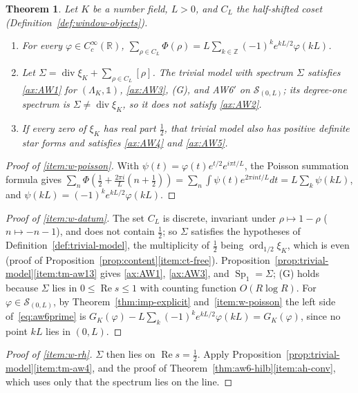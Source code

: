 \documentclass[11pt]{amsart}
\theoremstyle{plain}
\newtheorem{theorem}{Theorem}[section]
\theoremstyle{definition}
\theoremstyle{remark}
\numberwithin{equation}{section}
\newcommand{\R}{\mathbb{R}}
\newcommand{\Z}{\mathbb{Z}}
\DeclareMathOperator{\divisor}{div}
\DeclareMathOperator{\Rea}{Re}
\DeclareMathOperator{\ord}{ord}
\renewcommand{\Re}{\Rea}
\begin{document}
\begin{theorem}\label{thm:window}
Let $K$ be a number field, $L>0$, and $C_L$ the half-shifted coset
(Definition~\ref{def:window-objects}).
\begin{enumerate}[label=(\roman*)]
\item\label{item:w-poisson} For every $\varphi\in C_c^\infty(\R)$,
  $\sum_{\rho\in C_L}\Phi(\rho)=L\sum_{k\in\Z}(-1)^ke^{kL/2}\varphi(kL)$.
\item\label{item:w-datum} Let $\Sigma=\divisor\xi_K+\sum_{\rho\in
  C_L}[\rho]$. The trivial model with spectrum $\Sigma$ satisfies
  \ref{ax:AW1} for $(\Lambda_K,\mathbb 1)$, \ref{ax:AW3}, (G), and
  AW6$'$ on $\mathcal S_{(0,L)}$; its degree-one spectrum is
  $\Sigma\ne\divisor\xi_K$, so it does not satisfy \ref{ax:AW2}.
\item\label{item:w-rh} If every zero of $\xi_K$ has real part
  $\tfrac12$, that trivial model also has positive definite star forms
  and satisfies \ref{ax:AW4} and \ref{ax:AW5}.
\end{enumerate}
\end{theorem}

\begin{proof}[Proof of \ref{item:w-poisson}]
With $\psi(t)=\varphi(t)e^{t/2}e^{i\pi t/L}$, the Poisson summation
formula gives $\sum_n\Phi(\tfrac12+\tfrac{2\pi i}L(n+\tfrac12))
=\sum_n\int\psi(t)e^{2\pi int/L}dt=L\sum_k\psi(kL)$, and
$\psi(kL)=(-1)^ke^{kL/2}\varphi(kL)$.
\end{proof}

\begin{proof}[Proof of \ref{item:w-datum}]
The set $C_L$ is discrete, invariant under $\rho\mapsto1-\rho$ ($n\mapsto
-n-1$), and does not contain $\tfrac12$; so $\Sigma$ satisfies the
hypotheses of Definition~\ref{def:trivial-model}, the multiplicity of
$\tfrac12$ being $\ord_{1/2}\xi_K$, which is even (proof of
Proposition~\ref{prop:content}\ref{item:ct-free}).
Proposition~\ref{prop:trivial-model}\ref{item:tm-aw13} gives
\ref{ax:AW1}, \ref{ax:AW3}, and $\operatorname{Sp}_1=\Sigma$; (G) holds
because $\Sigma$ lies in $0\le\Re s\le1$ with counting function
$O(R\log R)$. For $\varphi\in\mathcal S_{(0,L)}$, by
Theorem~\ref{thm:imp-explicit} and~\ref{item:w-poisson} the left side
of~\eqref{eq:aw6prime} is $G_K(\varphi)-L\sum_k(-1)^ke^{kL/2}
\varphi(kL)=G_K(\varphi)$, since no point $kL$ lies in $(0,L)$.
\end{proof}

\begin{proof}[Proof of \ref{item:w-rh}]
$\Sigma$ then lies on $\Re s=\tfrac12$. Apply
Proposition~\ref{prop:trivial-model}\ref{item:tm-aw4}, and the proof
of Theorem~\ref{thm:aw6-hilb}\ref{item:ah-conv}, which uses only that
the spectrum lies on the line.
\end{proof}
\end{document}
